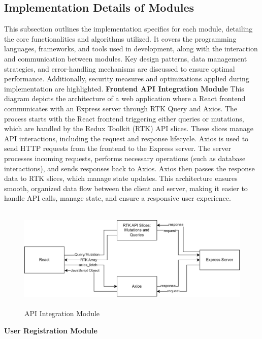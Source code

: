 \subsection{Implementation Details of Modules}
This subsection outlines the implementation specifics for each module, detailing the core functionalities and algorithms utilized. It covers the programming languages, frameworks, and tools used in development, along with the interaction and communication between modules. Key design patterns, data management strategies, and error-handling mechanisms are discussed to ensure optimal performance. Additionally, security measures and optimizations applied during implementation are highlighted.
\newline
\textbf{Frontend API Integration Module}\newline
This diagram depicts the architecture of a web application where a React frontend communicates with an Express server through RTK Query and Axios. The process starts with the React frontend triggering either queries or mutations, which are handled by the Redux Toolkit (RTK) API slices. These slices manage API interactions, including the request and response lifecycle. Axios is used to send HTTP requests from the frontend to the Express server. The server processes incoming requests, performs necessary operations (such as database interactions), and sends responses back to Axios. Axios then passes the response data to RTK slices, which manage state updates. This architecture ensures smooth, organized data flow between the client and server, making it easier to handle API calls, manage state, and ensure a responsive user experience.
\begin{figure}[H]
    \centering
     \includegraphics[height = 5cm]{Diagrams/API.png}
     \caption{API Integration Module}
 \end{figure}
\textbf{User Registration Module}

